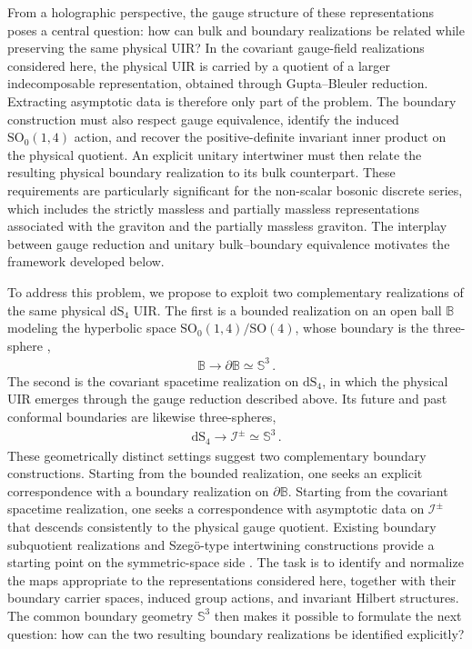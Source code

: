 \documentclass{SciPost}
\begin{document}
From a holographic perspective, the gauge structure of these representations poses a central question: how can bulk and boundary realizations be related while preserving the same physical UIR? In the covariant gauge-field realizations considered here, the physical UIR is carried by a quotient of a larger indecomposable representation, obtained through Gupta--Bleuler reduction. Extracting asymptotic data is therefore only part of the problem. The boundary construction must also respect gauge equivalence, identify the induced $\mathrm{SO}_0(1,4)$ action, and recover the positive-definite invariant inner product on the physical quotient. An explicit unitary intertwiner must then relate the resulting physical boundary realization to its bulk counterpart. These requirements are particularly significant for the non-scalar bosonic discrete series, which includes the strictly massless and partially massless representations associated with the graviton and the partially massless graviton. The interplay between gauge reduction and unitary bulk--boundary equivalence motivates the framework developed below.

To address this problem, we propose to exploit two complementary realizations of the same physical $\mathrm{dS}_{4}$ UIR. The first is a bounded realization on an open ball $\mathbb{B}$ modeling the hyperbolic space $\mathrm{SO}_0(1,4)/\mathrm{SO}(4)$, whose boundary is the three-sphere \cite{Takahashi,Gazeau2024},
\begin{align}\label{eq:compact-boundary}
    \mathbb{B} \longrightarrow \partial\mathbb{B} \simeq \mathbb{S}^{3} \,.
\end{align}
The second is the covariant spacetime realization on $\mathrm{dS}_{4}$, in which the physical UIR emerges through the gauge reduction described above. Its future and past conformal boundaries are likewise three-spheres,
\begin{align}\label{eq:ds-boundary}
    \mathrm{dS}_{4} \longrightarrow \mathscr{I}^{\pm} \simeq \mathbb{S}^{3} \,.
\end{align}
These geometrically distinct settings suggest two complementary boundary constructions. Starting from the bounded realization, one seeks an explicit correspondence with a boundary realization on $\partial\mathbb{B}$. Starting from the covariant spacetime realization, one seeks a correspondence with asymptotic data on $\mathscr{I}^{\pm}$ that descends consistently to the physical gauge quotient. Existing boundary subquotient realizations and Szeg\"o-type intertwining constructions provide a starting point on the symmetric-space side \cite{KnappWallach1976, KnappWallach1980, Seppanen2009}. The task is to identify and normalize the maps appropriate to the representations considered here, together with their boundary carrier spaces, induced group actions, and invariant Hilbert structures. The common boundary geometry $\mathbb{S}^{3}$ then makes it possible to formulate the next question: how can the two resulting boundary realizations be identified explicitly?
\end{document}
